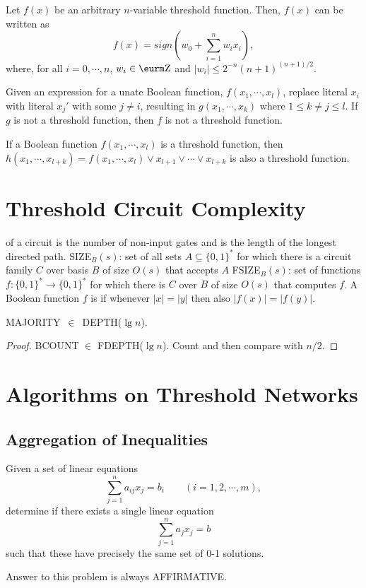 \documentclass{myproc}
\begin{document}
\begin{theorem} \cite{Muroga71} Let $f(x)$ be an arbitrary $n$-variable
  threshold function. Then, $f(x)$ can be written as
  \[ f(x) = sign\left(w_0 + \sum_{i = 1}^nw_ix_i\right),\]
  where, for all $i = 0, \cdots, n$, 
 $w_i \in \Z$ and $|w_i| \le 2^{-n}(n+1)^{(n+1)/2}$.
\end{theorem}

\begin{theorem}
\cite{ZGZJ05} Given an expression for a unate Boolean
function, $f(x_1, \cdots, x_l)$, replace literal $x_i$ with literal $x_j'$
with some $j \ne i$, resulting in $g(x_1, \cdots, x_k)$ where $1 \le k \ne j
\le l$. If $g$ is not a threshold function, then $f$ is not a threshold
function. 
\end{theorem}

\begin{theorem}
\cite{ZGZJ05} If a Boolean function $f(x_1, \cdots, x_l)$ is
a threshold function, then $h(x_1, \cdots, x_{l+k}) = f(x_1, \cdots, x_l) \vee
x_{l+1} \vee \cdots \vee x_{l+k}$ is also a threshold function.
\end{theorem}


\section{Threshold Circuit Complexity}
\bit
\w {} of a circuit is the number of non-input gates and  
is the length of the longest directed path.
\w SIZE$_B(s)$: set of all sets $A \subseteq \{0, 1\}^*$ for which there is a
circuit family $C$ over basis $B$ of size $O(s)$ that accepts $A$
\w FSIZE$_B(s)$: set of functions $f: \{0, 1\}^* \rightarrow \{0, 1\}^*$ for
which there is $C$ over $B$ of size $O(s)$ that computes $f$.
\w A Boolean function $f$ is  if whenever $|x| = |y|$
then also $|f(x)| = |f(y)|$.
\eit
\begin{theorem}
\mbox{\rm MAJORITY $\in$  DEPTH($\lg n$)}.
\end{theorem}
\begin{proof}
BCOUNT $\in$ FDEPTH($\lg n$). Count and then compare with $n/2$. \qedb
\end{proof}


\section{Algorithms on Threshold Networks}
\subsection{Aggregation of Inequalities}
\begin{problem}
Given a set of linear equations
\[\sum_{j=1}^n a_{ij}x_j = b_i \qquad (i = 1, 2, \cdots, m),\]
determine if there exists a single linear equation
\[\sum_{j=1}^n a_{j}x_j = b\]
such that these have precisely the same set of 0-1 solutions.
\end{problem}
\bit
\w Answer to this problem is always AFFIRMATIVE.
\eit
\end{document}
